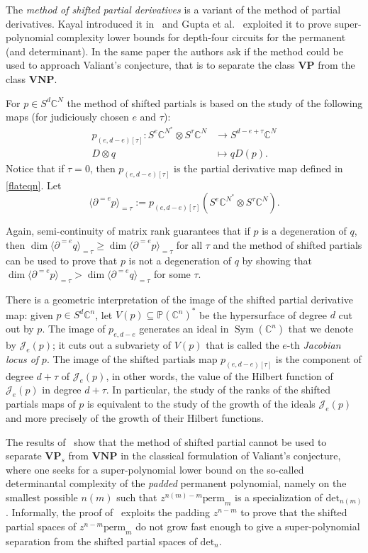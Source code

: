 \documentclass[11pt]{article}
\numberwithin{equation}{section}
\theoremstyle{definition}
\theoremstyle{plain}
\newcommand{\calJ}{\mathcal{J}}
\newcommand{\bbC}{\mathbb{C}}
\newcommand{\bbP}{\mathbb{P}}
\DeclareMathOperator{\Sym}{Sym}
\newcommand{\bfVNP}{\mathbf{VNP}}
\newcommand{\bfVP}{\mathbf{VP}}
\newcommand{\perm}{\mathrm{perm}}
\renewcommand{\det}{\mathrm{det}}
\def\BC{\mathbb C}
\def\t{\tau}
\begin{document}
    
The \emph{method of shifted partial derivatives} is a variant of the method of partial derivatives. %
Kayal introduced it in~\cite{DBLP:journals/eccc/Kayal12} and Gupta et al.~\cite{gupta4} exploited it to prove super-polynomial complexity lower bounds for depth-four circuits for the permanent (and determinant). In the same paper the authors ask if the method could be used to approach Valiant's conjecture, that is to separate the class $\bfVP$ from the class $\bfVNP$.

For $p\in S^d\BC^N$  the method of shifted partials is based on the study of the following maps (for judiciously chosen $e$ and $\tau$):
\begin{align*}
p_{(e,d-e)[\t]}:S^{e}\BC^{N^*}\otimes S^\tau \BC^N& \to S^{d-e+\tau}\BC^N\\
D\otimes q&\mapsto qD(p).
\end{align*}
Notice that if $\tau = 0$, then $p_{(e,d-e)[\tau]}$ is the partial derivative map defined in \eqref{flateqn}. Let
\[
  \langle \partial^{=e}p\rangle_{=\t}:=p_{(e,d-e)[\t]}(S^{e}\BC^{N^*}\otimes S^\tau \BC^N).
\]

Again, semi-continuity of matrix rank guarantees that if $p$ is a degeneration of $q$, then $\dim \langle \partial^{=e} q \rangle_{=\t} \geq  \dim \langle \partial^{=e}p \rangle_{=\tau}$ for all $\t$ and the method of shifted partials can be used to prove that $p$ is not a degeneration of $q$ by showing that $\dim \langle \partial^{=e}p \rangle_{=\t} > \dim \langle \partial^{=e} q \rangle_{=\t}$ for some $\t$.

 There is a geometric interpretation of the image of the shifted partial derivative map: given $p \in S^d \bbC^n$, let $V(p) \subseteq \bbP (\bbC^n)^*$ be the hypersurface of degree $d$ cut out by $p$. The image of $p_{e,d-e}$ generates an ideal in $\Sym(\bbC^n)$ that we denote by $\calJ_e(p)$; it cuts out a subvariety of $V(p)$ that is called the $e$-th \emph{Jacobian locus of} $p$. The image of the shifted partials map $p_{(e,d-e)[\tau]}$ is the component of degree $d+\tau$ of $\calJ_e(p)$, in other words, the value of the Hilbert function of $\calJ_e(p)$ in degree $d+\t$.  In particular, the study of the ranks of the shifted partials maps of $p$ is equivalent to the study of the growth of the ideals $\calJ_e(p)$ and more precisely of the growth of their Hilbert functions.  

 The results of~\cite{2016arXiv160902103E} show that the method of shifted partial cannot be used to separate $\bfVP_s$ from $\bfVNP$ in the classical formulation of Valiant's conjecture, where one seeks for a super-polynomial lower bound on the so-called determinantal complexity of the \emph{padded} permanent polynomial, namely on the smallest possible $n(m)$ such that $z^{n(m)- m} \perm_m$ is a specialization of $\det_{n(m)}$. Informally, the proof of~\cite{2016arXiv160902103E} exploits the padding $z^{n-m}$ to prove that the shifted partial spaces of $z^{n-m} \perm_m$ do not grow fast enough to give a super-polynomial separation from the shifted partial spaces of $\det_n$.
 
\end{document}
